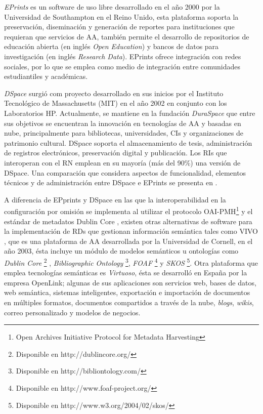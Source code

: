 \textit{EPrints} \cite{EPrints} es un software de uso libre desarrollado en el a\~{n}o 2000 por la Universidad de Southampton en el Reino Unido, esta plataforma soporta la preservaci\'on, diseminaci\'on y generaci\'on de reportes para instituciones que requieran que servicios de AA, tambi\'en permite el desarrollo de repositorios de educaci\'on abierta (en ingl\'es \textit{Open Education}) y bancos de datos para investigaci\'on (en ingl\'es \textit{Research Data}). EPrints ofrece integraci\'on con redes sociales, por lo que se emplea como medio de integraci\'on entre comunidades estudiantiles y acad\'emicas.\newline

\textit{DSpace} \cite{DSpaceRef} surgi\'o com proyecto desarrollado en sus inicios por el Instituto Tecnol\'ogico de Massachusetts (MIT) en el a\~{n}o 2002 en conjunto con los Laboratorios HP. Actualmente, se mantiene en la fundaci\'on \textit{DuraSpace} que entre sus objetivos se encuentran la innovaci\'on en tecnolog\'ias de AA y basadas en nube, principalmente para bibliotecas, universidades, CIs y organizaciones de patrimonio cultural. DSpace soporta el almacenamiento de tesis, administraci\'on de registros electr\'onicos, preservaci\'on digital y publicaci\'on. Los RIs que interoperan con el RN \cite{RepositorioNacional} emplean en su mayor\'ia (m\'as del 90\%) una versi\'on de DSpace.  Una comparaci\'on que considera aspectos de funcionalidad, elementos t\'ecnicos y de administraci\'on entre DSpace e EPrints se presenta en \cite{EvaluacionDeUsabilidad}.\newline

A diferencia de EPprints y DSpace en las que la interoperabilidad en la configuraci\'on por omisi\'on se implementa al utilizar el protocolo  OAI-PMH\footnote{Open Archives Initiative Protocol for Metadata Harvesting} \cite{Lagoze2005} y el est\'andar de metadatos Dublin Core \cite{DublinCore}, existen otras alternativas de software para la implementaci\'on de RDs que gestionan informaci\'on sem\'antica tales como VIVO \cite{VivoWeb}, que es una plataforma de AA desarrollada por la Universidad de Cornell, en el a\~{n}o 2003, \'esta incluye un m\'odulo de modelos sem\'anticos u ontolog\'ias como \textit{Dublin Core} \footnote{Disponible en http://dublincore.org/} , \textit{Bibliographic Ontology} \footnote{Disponible en http://bibliontology.com/}, \textit{FOAF} \footnote{Disponible en http://www.foaf-project.org/} y \textit{SKOS} \footnote{Disponible en http://www.w3.org/2004/02/skos/}. 
Otra plataforma que emplea tecnolog\'ias sem\'anticas es \emph{Virtuoso}, \'esta se desarroll\'o en Espa\~{n}a por la empresa OpenLink\cite{VirtuosoRef}; algunas de sus aplicaciones son servicios web, bases de datos, web sem\'antica, sistemas inteligentes, exportaci\'on e importaci\'on de documentos en m\'ultiples formatos, documentos compartidos a trav\'es de la nube, \emph{blogs}, \emph{wikis}, correo personalizado y modelos de negocios.\newline

